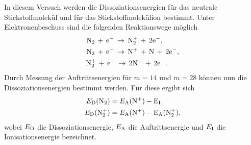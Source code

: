 In diesem Versuch werden die Dissoziationsenergien für das neutrale Stickstoffmolekül und für das Stickstoffmolekülion bestimmt. Unter Elektronenbeschuss sind die folgenden Reaktionswege möglich
\begin{align}
 \rm{N}_{2} \, + \, \rm{e}^{-} \, &\to \, \rm{N}_{2}^{+} \, + \, 2\rm{e}^{-}, \\
 \rm{N}_{2} \, + \, \rm{e}^{-} \, &\to \, \rm{N}^{+} \, + \, \rm{N} \, + \, 2\rm{e}^{-}, \\
 \rm{N}_{2}^{+} \, + \, \rm{e}^{-} &\, \to \, 2\rm{N}^{+} \, + \, 2\rm{e}^{-}.
\end{align}
Durch Messung der Auftrittsenergien für $m=14$ und $m=28$ können nun die Dissoziationsenergien bestimmt werden. Für diese ergibt sich
\begin{align*}
 E_{\rm{D}}(\rm{N}_{2}) &= E_{\rm{A}}(\rm{N}^{+}) - E_{\rm{I}}, \\
 E_{\rm{D}}(\rm{N}_{2}^{+}) &= E_{\rm{A}}(\rm{N}^{+}) - E_{\rm{A}}(\rm{N}_{2}^{+}),
\end{align*}
wobei $E_{\rm{D}}$ die Dissoziationsenergie, $E_{\rm{A}}$ die Auftrittsenergie und $E_{\rm{I}}$ die Ionisationsenergie bezeichnet.







